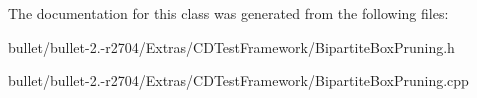 The documentation for this class was generated from the following files\+:\begin{DoxyCompactItemize}
\item 
bullet/bullet-\/2.-\/r2704/\+Extras/\+C\+D\+Test\+Framework/Bipartite\+Box\+Pruning.\+h\item 
bullet/bullet-\/2.-\/r2704/\+Extras/\+C\+D\+Test\+Framework/Bipartite\+Box\+Pruning.\+cpp\end{DoxyCompactItemize}
